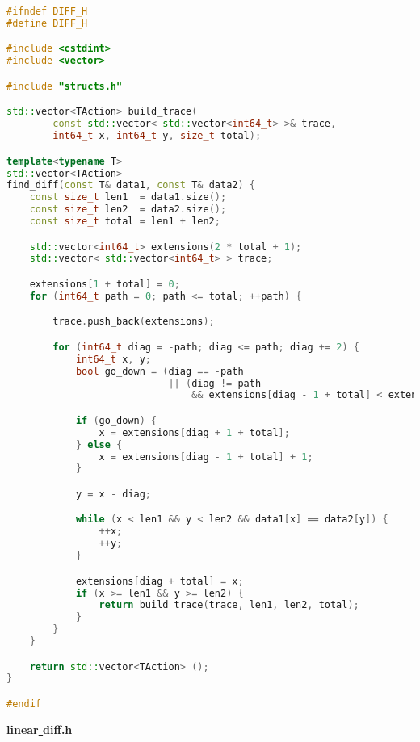 \begin{lstlisting}[language=C++]
#ifndef DIFF_H
#define DIFF_H

#include <cstdint>
#include <vector>

#include "structs.h"

std::vector<TAction> build_trace(
        const std::vector< std::vector<int64_t> >& trace, 
        int64_t x, int64_t y, size_t total);

template<typename T>
std::vector<TAction> 
find_diff(const T& data1, const T& data2) {
    const size_t len1  = data1.size();
    const size_t len2  = data2.size();
    const size_t total = len1 + len2;

    std::vector<int64_t> extensions(2 * total + 1);
    std::vector< std::vector<int64_t> > trace;

    extensions[1 + total] = 0;
    for (int64_t path = 0; path <= total; ++path) {

        trace.push_back(extensions);

        for (int64_t diag = -path; diag <= path; diag += 2) {
            int64_t x, y;
            bool go_down = (diag == -path 
                            || (diag != path 
                                && extensions[diag - 1 + total] < extensions[diag + 1 + total]));

            if (go_down) {
                x = extensions[diag + 1 + total];
            } else {
                x = extensions[diag - 1 + total] + 1;
            }

            y = x - diag;

            while (x < len1 && y < len2 && data1[x] == data2[y]) {
                ++x;
                ++y;
            }

            extensions[diag + total] = x;
            if (x >= len1 && y >= len2) {
                return build_trace(trace, len1, len2, total);
            }
        }
    }

    return std::vector<TAction> ();
}

#endif
\end{lstlisting}

\textbf{linear\underline{ }diff.h}

